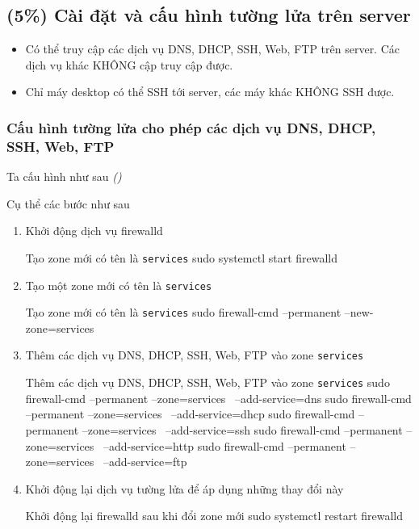 \subsection{(5\%) Cài đặt và cấu hình tường lửa trên server}

\begin{itemize}[label={--}]
  \item Có thể truy cập các dịch vụ DNS, DHCP, SSH, Web, FTP trên server. Các
        dịch vụ khác KHÔNG cập truy cập được.
  \item Chỉ máy desktop có thể SSH tới server, các máy khác KHÔNG SSH được.
\end{itemize}


\subsubsection{Cấu hình tường lửa cho phép các dịch vụ DNS, DHCP, SSH, Web, FTP}

Ta cấu hình như sau \textit{()}


Cụ thể các bước như sau
\begin{enumerate}
  \item Khởi động dịch vụ firewalld\\
        \begin{coding}[gobble=10]{Tạo zone mới có tên là \texttt{services}}
          sudo systemctl start firewalld
        \end{coding}
  \item Tạo một zone mới có tên là \texttt{services}\\
        \begin{coding}[gobble=10]{Tạo zone mới có tên là \texttt{services}}
          sudo firewall-cmd --permanent --new-zone=services
        \end{coding}
  \item Thêm các dịch vụ DNS, DHCP, SSH, Web, FTP vào zone \texttt{services}\\
        \begin{coding}[gobble=10]{Thêm các dịch vụ DNS, DHCP, SSH, Web, FTP vào zone \texttt{services}}
          sudo firewall-cmd --permanent --zone=services \ --add-service=dns
          sudo firewall-cmd --permanent --zone=services \ --add-service=dhcp
          sudo firewall-cmd --permanent --zone=services \ --add-service=ssh
          sudo firewall-cmd --permanent --zone=services \ --add-service=http
          sudo firewall-cmd --permanent --zone=services \ --add-service=ftp
        \end{coding}
  \item Khởi động lại dịch vụ tường lửa để áp dụng những thay đổi này\\
        \begin{coding}[gobble=10]{Khởi động lại firewalld sau khi đổi zone mới}
          sudo systemctl restart firewalld
        \end{coding}
\end{enumerate}

